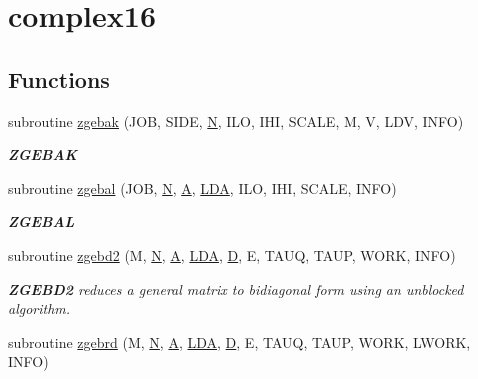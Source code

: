 \hypertarget{group__complex16GEcomputational}{}\section{complex16}
\label{group__complex16GEcomputational}
\subsection*{Functions}
\begin{DoxyCompactItemize}
\item 
subroutine \hyperlink{group__complex16GEcomputational_ga84f450f70925de169aa4be5ce75a51cc}{zgebak} (J\+O\+B, S\+I\+D\+E, \hyperlink{polmisc_8c_a0240ac851181b84ac374872dc5434ee4}{N}, I\+L\+O, I\+H\+I, S\+C\+A\+L\+E, M, V, L\+D\+V, I\+N\+F\+O)
\begin{DoxyCompactList}\small\item\em {\bfseries Z\+G\+E\+B\+A\+K} \end{DoxyCompactList}\item 
subroutine \hyperlink{group__complex16GEcomputational_ga4861b77e1503bc61f2946cadc1fe5128}{zgebal} (J\+O\+B, \hyperlink{polmisc_8c_a0240ac851181b84ac374872dc5434ee4}{N}, \hyperlink{classA}{A}, \hyperlink{example__user_8c_ae946da542ce0db94dced19b2ecefd1aa}{L\+D\+A}, I\+L\+O, I\+H\+I, S\+C\+A\+L\+E, I\+N\+F\+O)
\begin{DoxyCompactList}\small\item\em {\bfseries Z\+G\+E\+B\+A\+L} \end{DoxyCompactList}\item 
subroutine \hyperlink{group__complex16GEcomputational_gad5a784fc93cbf57b6b8ff3f0ff229cbe}{zgebd2} (M, \hyperlink{polmisc_8c_a0240ac851181b84ac374872dc5434ee4}{N}, \hyperlink{classA}{A}, \hyperlink{example__user_8c_ae946da542ce0db94dced19b2ecefd1aa}{L\+D\+A}, \hyperlink{odrpack_8h_a7dae6ea403d00f3687f24a874e67d139}{D}, E, T\+A\+U\+Q, T\+A\+U\+P, W\+O\+R\+K, I\+N\+F\+O)
\begin{DoxyCompactList}\small\item\em {\bfseries Z\+G\+E\+B\+D2} reduces a general matrix to bidiagonal form using an unblocked algorithm. \end{DoxyCompactList}\item 
subroutine \hyperlink{group__complex16GEcomputational_gad12a48a5c74ecf1697170d85d71d7e96}{zgebrd} (M, \hyperlink{polmisc_8c_a0240ac851181b84ac374872dc5434ee4}{N}, \hyperlink{classA}{A}, \hyperlink{example__user_8c_ae946da542ce0db94dced19b2ecefd1aa}{L\+D\+A}, \hyperlink{odrpack_8h_a7dae6ea403d00f3687f24a874e67d139}{D}, E, T\+A\+U\+Q, T\+A\+U\+P, W\+O\+R\+K, L\+W\+O\+R\+K, I\+N\+F\+O)

\end{DoxyCompactItemize}
